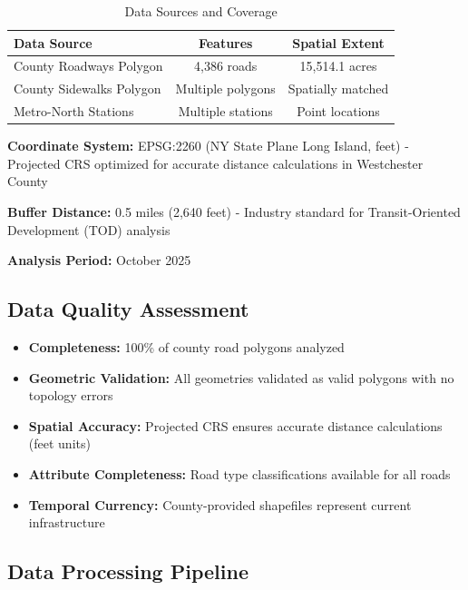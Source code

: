 \documentclass[11pt,letterpaper]{article}
\begin{document}
\begin{table}[H]
\centering
\begin{tabular}{@{}lcc@{}}
\toprule
\textbf{Data Source} & \textbf{Features} & \textbf{Spatial Extent} \\
\midrule
County Roadways Polygon & 4,386 roads & 15,514.1 acres \\
County Sidewalks Polygon & Multiple polygons & Spatially matched \\
Metro-North Stations & Multiple stations & Point locations \\
\bottomrule
\end{tabular}
\caption{Data Sources and Coverage}
\end{table}

\textbf{Coordinate System:} EPSG:2260 (NY State Plane Long Island, feet) - Projected CRS optimized for accurate distance calculations in Westchester County

\textbf{Buffer Distance:} 0.5 miles (2,640 feet) - Industry standard for Transit-Oriented Development (TOD) analysis

\textbf{Analysis Period:} October 2025

\subsection{Data Quality Assessment}

\begin{itemize}
    \item \textbf{Completeness:} 100\% of county road polygons analyzed
    \item \textbf{Geometric Validation:} All geometries validated as valid polygons with no topology errors
    \item \textbf{Spatial Accuracy:} Projected CRS ensures accurate distance calculations (feet units)
    \item \textbf{Attribute Completeness:} Road type classifications available for all roads
    \item \textbf{Temporal Currency:} County-provided shapefiles represent current infrastructure
\end{itemize}

\subsection{Data Processing Pipeline}
\end{document}
